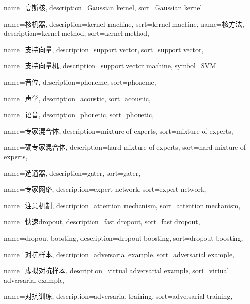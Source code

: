 {
  name=高斯核,
  description={Gaussian kernel},
  sort={Gaussian kernel},
}

{
  name=核机器,
  description={kernel machine},
  sort={kernel machine},
}
{
  name=核方法,
  description={kernel method},
  sort={kernel method},
}

{
  name=支持向量,
  description={support vector},
  sort={support vector},
}

{
  name=支持向量机,
  description={support vector machine},
  symbol={SVM}
}

{
  name=音位,
  description={phoneme},
  sort={phoneme},
}

{
  name=声学,
  description={acoustic},
  sort={acoustic},
}

{
  name=语音,
  description={phonetic},
  sort={phonetic},
}

{
  name=专家混合体,
  description={mixture of experts},
  sort={mixture of experts},
}

{
  name=硬专家混合体, %
  description={hard mixture of experts},
  sort={hard mixture of experts},
}

{
  name=选通器,
  description={gater},
  sort={gater},
}

{
  name=专家网络,
  description={expert network},
  sort={expert network},
}

{
  name=注意机制,
  description={attention mechanism},
  sort={attention mechanism},
}

{
  name=快速dropout,
  description={fast dropout},
  sort={fast dropout},
}

{
  name=dropout boosting,
  description={dropout boosting},
  sort={dropout boosting},
}

{
  name=对抗样本,
  description={adversarial example},
  sort={adversarial example},
}

{
  name=虚拟对抗样本,
  description={virtual adversarial example},
  sort={virtual adversarial example},
}

{
  name=对抗训练,
  description={adversarial training},
  sort={adversarial training},
}

